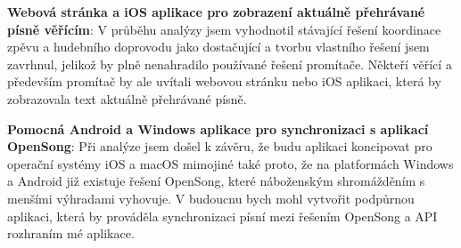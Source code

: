 \textbf{Webová stránka a iOS aplikace pro zobrazení aktuálně přehrávané písně věřícím}: V průběhu analýzy jsem vyhodnotil stávající řešení koordinace zpěvu a hudebního doprovodu jako dostačující a tvorbu vlastního řešení jsem zavrhnul, jelikož by plně nenahradilo používané řešení promítače. Někteří věřící a především promítač by ale uvítali webovou stránku nebo iOS aplikaci, která by zobrazovala text aktuálně přehrávané písně.

\textbf{Pomocná Android a Windows aplikace pro synchronizaci s aplikací OpenSong}: Při analýze jsem došel k závěru, že budu aplikaci koncipovat pro operační systémy iOS a \mbox{macOS} mimojiné také proto, že na platformách Windows a Android již existuje řešení OpenSong, které náboženským shromážděním s menšími výhradami vyhovuje. V budoucnu bych mohl vytvořit podpůrnou aplikaci, která by prováděla synchronizaci písní mezi řešením OpenSong a API rozhraním mé aplikace.

